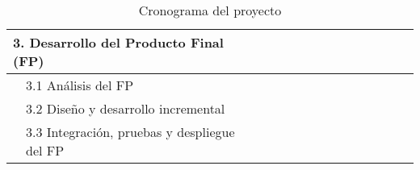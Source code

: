 \documentclass{subfiles}
\begin{document}
\begin{landscape}
\begin{table}
\begin{tabular}{|ll|ccc|ccccccccc|}
\multicolumn{2}{|l|}{3. Desarrollo del Producto Final (FP)}                   & \multicolumn{1}{c|}{}                         & \multicolumn{1}{c|}{}                         &                          & \multicolumn{1}{c|}{}                         & \multicolumn{1}{c|}{}                         & \multicolumn{1}{c|}{\cellcolor[HTML]{656565}} & \multicolumn{1}{c|}{\cellcolor[HTML]{656565}} & \multicolumn{1}{c|}{\cellcolor[HTML]{656565}} & \multicolumn{1}{c|}{\cellcolor[HTML]{656565}} & \multicolumn{1}{c|}{\cellcolor[HTML]{656565}} & \multicolumn{1}{c|}{\cellcolor[HTML]{656565}} & \cellcolor[HTML]{656565} \\ \hline
              & 3.1 Análisis del FP                                           & \multicolumn{1}{c|}{}                         & \multicolumn{1}{c|}{}                         &                          & \multicolumn{1}{c|}{}                         & \multicolumn{1}{c|}{}                         & \multicolumn{1}{c|}{\cellcolor[HTML]{9B9B9B}} & \multicolumn{1}{c|}{\cellcolor[HTML]{9B9B9B}} & \multicolumn{1}{c|}{}                         & \multicolumn{1}{c|}{}                         & \multicolumn{1}{c|}{}                         & \multicolumn{1}{c|}{}                         &                          \\ \hline
              & 3.2 Diseño y desarrollo incremental                           & \multicolumn{1}{c|}{}                         & \multicolumn{1}{c|}{}                         &                          & \multicolumn{1}{c|}{}                         & \multicolumn{1}{c|}{}                         & \multicolumn{1}{c|}{}                         & \multicolumn{1}{c|}{\cellcolor[HTML]{9B9B9B}} & \multicolumn{1}{c|}{\cellcolor[HTML]{9B9B9B}} & \multicolumn{1}{c|}{\cellcolor[HTML]{9B9B9B}} & \multicolumn{1}{c|}{\cellcolor[HTML]{9B9B9B}} & \multicolumn{1}{c|}{\cellcolor[HTML]{9B9B9B}} & \cellcolor[HTML]{9B9B9B} \\ \hline
              & 3.3 Integración, pruebas y despliegue del FP                  & \multicolumn{1}{c|}{}                         & \multicolumn{1}{c|}{}                         &                          & \multicolumn{1}{c|}{}                         & \multicolumn{1}{c|}{}                         & \multicolumn{1}{c|}{}                         & \multicolumn{1}{c|}{}                         & \multicolumn{1}{c|}{}                         & \multicolumn{1}{c|}{}                         & \multicolumn{1}{c|}{}                         & \multicolumn{1}{c|}{\cellcolor[HTML]{9B9B9B}} & \cellcolor[HTML]{9B9B9B} \\ \hline
\end{tabular}
\caption{Cronograma del proyecto}
\label{tab:cronograma_del_proyecto}
\end{table}
\end{landscape}
\end{document}
